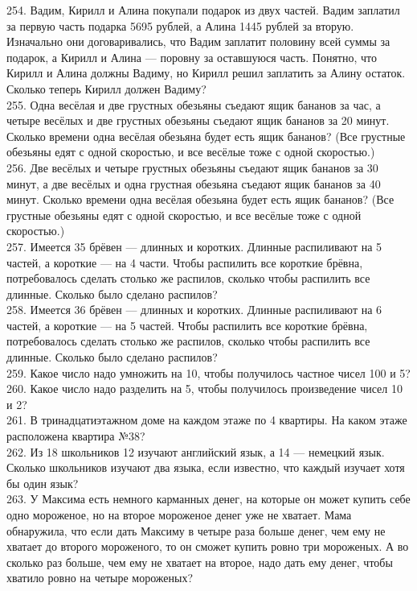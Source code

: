 254. Вадим, Кирилл и Алина покупали подарок из двух частей. Вадим заплатил за первую часть подарка 5695 рублей, а Алина 1445 рублей за вторую. Изначально они договаривались, что Вадим заплатит половину всей суммы за подарок, а Кирилл и Алина --- поровну за оставшуюся часть. Понятно, что Кирилл и Алина должны Вадиму, но Кирилл решил заплатить за Алину остаток. Сколько теперь Кирилл должен Вадиму?\\
255. Одна весёлая и две грустных обезьяны съедают ящик бананов за час, а четыре весёлых и две грустных обезьяны съедают ящик бананов за 20 минут. Сколько времени одна весёлая обезьяна будет есть ящик бананов? (Все грустные обезьяны едят с одной скоростью, и все весёлые тоже с одной скоростью.)\\
256. Две весёлых и четыре грустных обезьяны съедают ящик бананов за 30 минут, а две весёлых и одна грустная обезьяна съедают ящик бананов за 40 минут. Сколько времени одна весёлая обезьяна будет есть ящик бананов? (Все грустные обезьяны едят с одной скоростью, и все весёлые тоже с одной скоростью.)\\
257. Имеется 35 брёвен --- длинных и коротких. Длинные распиливают на 5 частей, а короткие --- на 4 части. Чтобы распилить все короткие брёвна, потребовалось сделать столько же распилов, сколько чтобы распилить все длинные. Сколько было сделано распилов?\\
258. Имеется 36 брёвен --- длинных и коротких. Длинные распиливают на 6 частей, а короткие --- на 5 частей. Чтобы распилить все короткие брёвна, потребовалось сделать столько же распилов, сколько чтобы распилить все длинные. Сколько было сделано распилов?\\
259. Какое число надо умножить на 10, чтобы получилось частное чисел 100 и 5?\\
260. Какое число надо разделить на 5, чтобы получилось произведение чисел 10 и 2?\\
261. В тринадцатиэтажном доме на каждом этаже по 4 квартиры. На каком этаже расположена квартира №38?\\
262. Из 18 школьников 12 изучают английский язык, а 14 --- немецкий язык. Сколько школьников изучают два языка, если известно, что каждый изучает хотя бы один язык?\\
263. У Максима есть немного карманных денег, на которые он может купить себе одно мороженое, но на второе мороженое денег уже не хватает. Мама обнаружила, что если дать Максиму в четыре раза больше денег, чем ему не хватает до второго мороженого, то он сможет купить ровно три мороженых. А во сколько раз больше, чем ему не хватает на второе, надо дать ему денег, чтобы хватило ровно на четыре мороженых?\\

